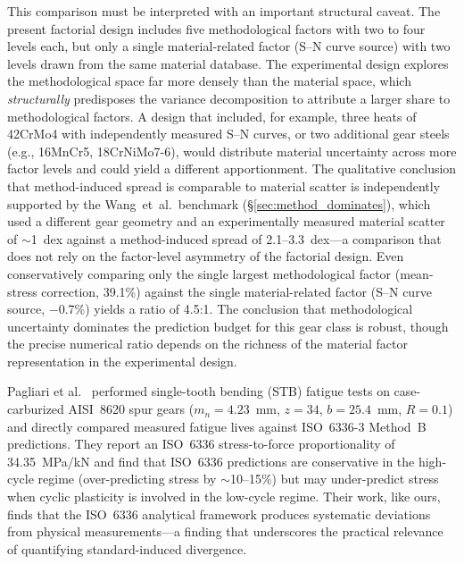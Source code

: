 \documentclass[12pt,a4paper]{article}
\begin{document}
This comparison must be interpreted with an important structural
caveat. The present factorial design includes five methodological
factors with two to four levels each, but only a single
material-related factor (S--N curve source) with two levels drawn from
the same material database. The experimental design explores
the methodological space far more densely than the material space,
which \emph{structurally} predisposes the variance decomposition to
attribute a larger share to methodological factors. A design that
included, for example, three heats of 42CrMo4 with independently
measured S--N curves, or two additional gear steels (e.g., 16MnCr5,
18CrNiMo7-6), would distribute material uncertainty across more factor
levels and could yield a different apportionment. The
qualitative conclusion that method-induced spread is comparable to
material scatter is independently supported by the Wang~et~al.\
benchmark (\S\ref{sec:method_dominates}), which used a different gear
geometry and an experimentally measured material scatter of $\sim$1~dex
against a method-induced spread of 2.1--3.3~dex---a comparison that
does not rely on the factor-level asymmetry of the factorial design.
Even conservatively comparing only the single largest methodological
factor (mean-stress correction, 39.1\%) against the single
material-related factor (S--N curve source, $-$0.7\%) yields a ratio of
4.5:1. The conclusion that methodological uncertainty dominates
the prediction budget for this gear class is robust, though
the precise numerical ratio depends on the richness of the material
factor representation in the experimental design.

Pagliari et al.~\cite{pagliari2025} performed single-tooth bending (STB)
fatigue tests on case-carburized AISI~8620 spur gears
($m_n{=}4.23$~mm, $z{=}34$, $b{=}25.4$~mm, $R{=}0.1$) and directly
compared measured fatigue lives against ISO~6336-3 Method~B predictions.
They report an ISO~6336 stress-to-force proportionality of
34.35~MPa/kN and find that ISO~6336 predictions are conservative in the
high-cycle regime (over-predicting stress by $\sim$10--15\%) but may
under-predict stress when cyclic plasticity is involved in the low-cycle
regime. Their work, like ours, finds that the ISO~6336 analytical
framework produces systematic deviations from physical measurements---a
finding that underscores the practical relevance of quantifying
standard-induced divergence.
\end{document}
